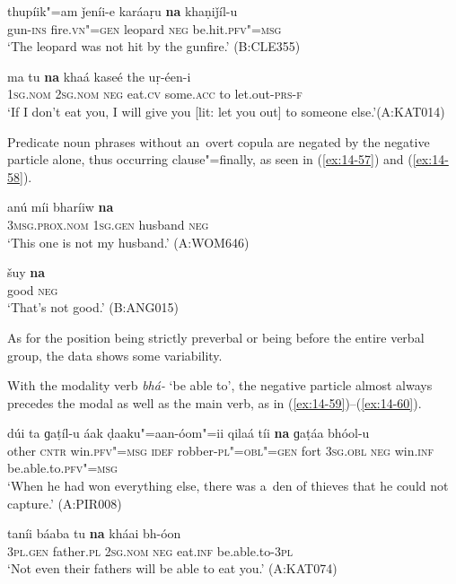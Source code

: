 \begin{exe}
\ex
\label{ex:14-55}
\gll thupíik"=am ǰeníi-e karáaṛu \textbf{na} khaṇiǰíl-u \\
gun-\textsc{ins} fire.\textsc{vn"=gen} leopard \textsc{neg} be.hit.\textsc{pfv"=msg}  \\
\glt `The leopard was not hit by the gunfire.' (B:CLE355)

\ex
\label{ex:14-56}
\gll ma tu \textbf{na} khaá kaseé the uṛ-éen-i \\
\textsc{1sg.nom} \textsc{2sg.nom} \textsc{neg} eat.\textsc{cv} some.\textsc{acc} to let.out-\textsc{prs-f} \\
\glt `If I don't eat you, I will give you [lit: let you out] to someone else.'\newline (A:KAT014)
\end{exe}

Predicate noun phrases without an~overt copula are negated by the negative particle alone, thus occurring clause"=finally, as seen in (\ref{ex:14-57}) and (\ref{ex:14-58}).

\begin{exe}
\ex
\label{ex:14-57}
\gll anú míi bharíiw \textbf{na} \\
\textsc{3msg.prox.nom} \textsc{1sg.gen} husband \textsc{neg} \\
\glt `This one is not my husband.' (A:WOM646)

\ex
\label{ex:14-58}
\gll šuy \textbf{na} \\
good \textsc{neg} \\
\glt `That's not good.' (B:ANG015)
\end{exe}

As for the position being strictly preverbal or being before the entire verbal group, the data shows some variability. 


With the modality verb \textit{bhá-} `be able to', the negative particle almost always precedes the modal as well as the main verb, as in (\ref{ex:14-59})--(\ref{ex:14-60}).

\begin{exe}
\ex
\label{ex:14-59}
\gll dúi ta ɡaṭíl-u áak ḍaaku"=aan-óom"=ii qilaá tíi \textbf{na} ɡaṭáa bhóol-u \\
other \textsc{cntr} win.\textsc{pfv"=msg} \textsc{idef} robber-\textsc{pl"=obl"=gen} fort  \textsc{3sg.obl} \textsc{neg} win.\textsc{inf} be.able.to.\textsc{pfv"=msg}  \\
\glt `When he had won everything else, there was a~den of thieves that he could not capture.' (A:PIR008)

\ex
\label{ex:14-60}
\gll taníi báaba tu \textbf{na} kháai bh-óon \\
\textsc{3pl.gen} father.\textsc{pl} \textsc{2sg.nom} \textsc{neg} eat.\textsc{inf} be.able.to-\textsc{3pl} \\
\glt `Not even their fathers will be able to eat you.' (A:KAT074)
\end{exe}


